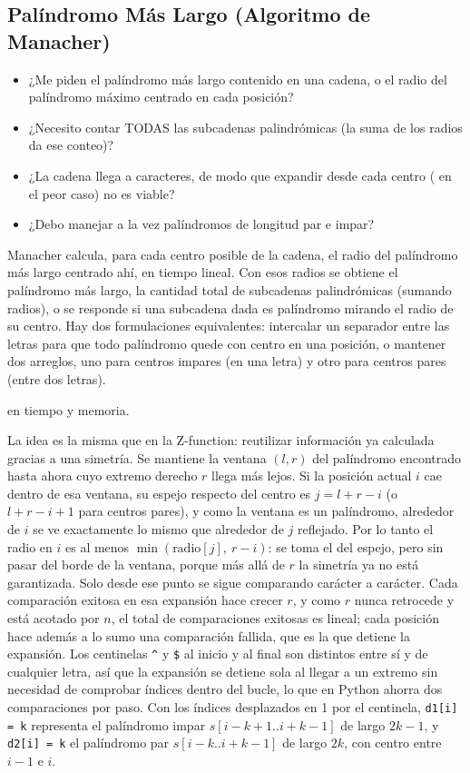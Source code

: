 \subsection{Palíndromo Más Largo (Algoritmo de Manacher)}
\label{alg:9-10}


\begin{itemize}
\item ¿Me piden el palíndromo más largo contenido en una cadena, o el radio del palíndromo máximo centrado en cada posición?
\item ¿Necesito contar TODAS las subcadenas palindrómicas (la suma de los radios da ese conteo)?
\item ¿La cadena llega a  caracteres, de modo que expandir desde cada centro ( en el peor caso) no es viable?
\item ¿Debo manejar a la vez palíndromos de longitud par e impar?
\end{itemize}

 Manacher calcula, para cada centro posible de la cadena, el radio del palíndromo más largo centrado ahí, en tiempo lineal. Con esos radios se obtiene el palíndromo más largo, la cantidad total de subcadenas palindrómicas (sumando radios), o se responde si una subcadena dada es palíndromo mirando el radio de su centro. Hay dos formulaciones equivalentes: intercalar un separador entre las letras para que todo palíndromo quede con centro en una posición, o mantener dos arreglos, uno para centros impares (en una letra) y otro para centros pares (entre dos letras).

  en tiempo y memoria.

 La idea es la misma que en la Z-function: reutilizar información ya calculada gracias a una simetría. Se mantiene la ventana $(l, r)$ del palíndromo encontrado hasta ahora cuyo extremo derecho $r$ llega más lejos. Si la posición actual $i$ cae dentro de esa ventana, su espejo respecto del centro es $j = l + r - i$ (o $l + r - i + 1$ para centros pares), y como la ventana es un palíndromo, alrededor de $i$ se ve exactamente lo mismo que alrededor de $j$ reflejado. Por lo tanto el radio en $i$ es al menos $\min(\text{radio}[j],\ r - i)$: se toma el del espejo, pero sin pasar del borde de la ventana, porque más allá de $r$ la simetría ya no está garantizada. Solo desde ese punto se sigue comparando carácter a carácter. Cada comparación exitosa en esa expansión hace crecer $r$, y como $r$ nunca retrocede y está acotado por $n$, el total de comparaciones exitosas es lineal; cada posición hace además a lo sumo una comparación fallida, que es la que detiene la expansión. Los centinelas \texttt{\textasciicircum} y \texttt{\$} al inicio y al final son distintos entre sí y de cualquier letra, así que la expansión se detiene sola al llegar a un extremo sin necesidad de comprobar índices dentro del bucle, lo que en Python ahorra dos comparaciones por paso. Con los índices desplazados en 1 por el centinela, \texttt{d1[i] = k} representa el palíndromo impar $s[i-k+1..i+k-1]$ de largo $2k-1$, y \texttt{d2[i] = k} el palíndromo par $s[i-k..i+k-1]$ de largo $2k$, con centro entre $i-1$ e $i$.~\cite{manacher1975}

